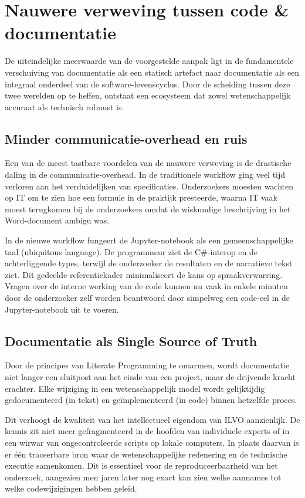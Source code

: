 \chapter{Nauwere verweving tussen code \& documentatie}
\label{ch:verweving_code_docs}

De uiteindelijke meerwaarde van de voorgestelde aanpak ligt in de fundamentele verschuiving van documentatie als een statisch artefact naar documentatie als een integraal onderdeel van de software-levenscyclus. Door de scheiding tussen deze twee werelden op te heffen, ontstaat een ecosysteem dat zowel wetenschappelijk accuraat als technisch robuust is.

\section{Minder communicatie-overhead en ruis}
Een van de meest tastbare voordelen van de nauwere verweving is de drastische daling in de communicatie-overhead. In de traditionele workflow ging veel tijd verloren aan het verduidelijken van specificaties. Onderzoekers moesten wachten op IT om te zien hoe een formule in de praktijk presteerde, waarna IT vaak moest terugkomen bij de onderzoekers omdat de wiskundige beschrijving in het Word-document ambigu was.

In de nieuwe workflow fungeert de Jupyter-notebook als een gemeenschappelijke taal (ubiquitous language). De programmeur ziet de C\#-interop en de achterliggende types, terwijl de onderzoeker de resultaten en de narratieve tekst ziet. Dit gedeelde referentiekader minimaliseert de kans op spraakverwarring. Vragen over de interne werking van de code kunnen nu vaak in enkele minuten door de onderzoeker zelf worden beantwoord door simpelweg een code-cel in de Jupyter-notebook uit te voeren.

\section{Documentatie als \textquotedbl Single Source of Truth\textquotedbl}
Door de principes van Literate Programming te omarmen, wordt documentatie niet langer een sluitpost aan het einde van een project, maar de drijvende kracht erachter. Elke wijziging in een wetenschappelijk model wordt gelijktijdig gedocumenteerd (in tekst) en geïmplementeerd (in code) binnen hetzelfde proces.

Dit verhoogt de kwaliteit van het intellectueel eigendom van ILVO aanzienlijk. De kennis zit niet meer gefragmenteerd in de hoofden van individuele experts of in een wirwar van ongecontroleerde scripts op lokale computers. In plaats daarvan is er één traceerbare bron waar de wetenschappelijke redenering en de technische executie samenkomen. Dit is essentieel voor de reproduceerbaarheid van het onderzoek, aangezien men jaren later nog exact kan zien welke aannames tot welke codewijzigingen hebben geleid.

